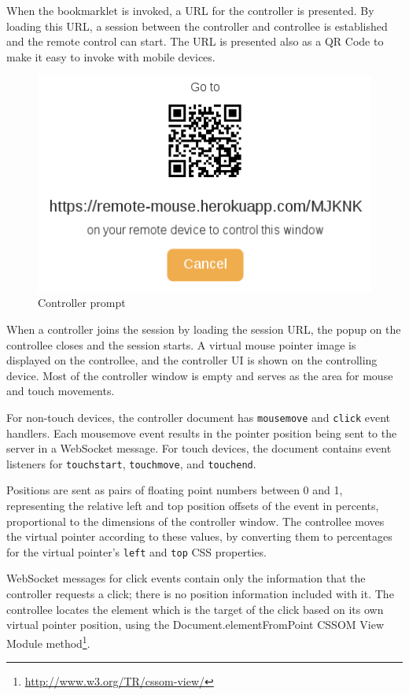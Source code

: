 \documentclass[a4paper,english,twocolumn]{article}
\begin{document}
When the bookmarklet is invoked, a URL for the controller is
presented. By loading this URL, a session between the controller and
controllee is established and the remote control can start. The URL is
presented also as a QR Code to make it easy to invoke with mobile
devices.

\begin{figure}[htb]
  \begin{center}
    \includegraphics[scale=0.3]{prompt}
    \caption{Controller prompt}
  \end{center}
\end{figure}

When a controller joins the session by loading the session URL, the
popup on the controllee closes and the session starts. A virtual mouse
pointer image is displayed on the controllee, and the controller UI is
shown on the controlling device. Most of the controller window is
empty and serves as the area for mouse and touch movements.

For non-touch devices, the controller document has \verb!mousemove!
and \verb!click!  event handlers. Each mousemove event results in the
pointer position being sent to the server in a WebSocket message. For
touch devices, the document contains event listeners
for \verb!touchstart!, \verb!touchmove!, and
\verb!touchend!.

Positions are sent as pairs of floating point numbers between 0 and 1,
representing the relative left and top position offsets of the event
in percents, proportional to the dimensions of the controller
window. The controllee moves the virtual pointer according to these
values, by converting them to percentages for the virtual pointer's
\verb!left! and \verb!top! CSS properties.

WebSocket messages for click events contain only the information that
the controller requests a click; there is no position information
included with it. The controllee locates the element which is the
target of the click based on its own virtual pointer position, using
the Document.elementFromPoint CSSOM View Module
method\footnote{\url{http://www.w3.org/TR/cssom-view/}}.
\end{document}
